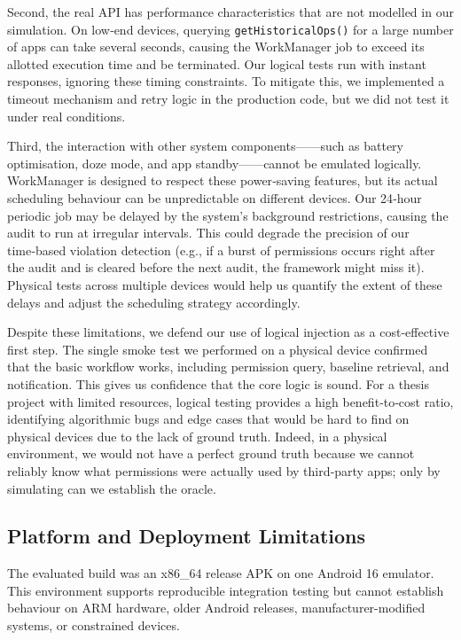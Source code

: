 Second, the real API has performance characteristics that are not modelled in our simulation. On low‑end devices, querying \texttt{getHistoricalOps()} for a large number of apps can take several seconds, causing the WorkManager job to exceed its allotted execution time and be terminated. Our logical tests run with instant responses, ignoring these timing constraints. To mitigate this, we implemented a timeout mechanism and retry logic in the production code, but we did not test it under real conditions.

Third, the interaction with other system components——such as battery optimisation, doze mode, and app standby——cannot be emulated logically. WorkManager is designed to respect these power‑saving features, but its actual scheduling behaviour can be unpredictable on different devices. Our 24‑hour periodic job may be delayed by the system's background restrictions, causing the audit to run at irregular intervals. This could degrade the precision of our time‑based violation detection (e.g., if a burst of permissions occurs right after the audit and is cleared before the next audit, the framework might miss it). Physical tests across multiple devices would help us quantify the extent of these delays and adjust the scheduling strategy accordingly.

Despite these limitations, we defend our use of logical injection as a cost‑effective first step. The single smoke test we performed on a physical device confirmed that the basic workflow works, including permission query, baseline retrieval, and notification. This gives us confidence that the core logic is sound. For a thesis project with limited resources, logical testing provides a high benefit‑to‑cost ratio, identifying algorithmic bugs and edge cases that would be hard to find on physical devices due to the lack of ground truth. Indeed, in a physical environment, we would not have a perfect ground truth because we cannot reliably know what permissions were actually used by third‑party apps; only by simulating can we establish the oracle.

\subsection{Platform and Deployment Limitations}

The evaluated build was an x86\_64 release APK on one Android 16 emulator. This environment supports reproducible integration testing but cannot establish behaviour on ARM hardware, older Android releases, manufacturer-modified systems, or constrained devices.

